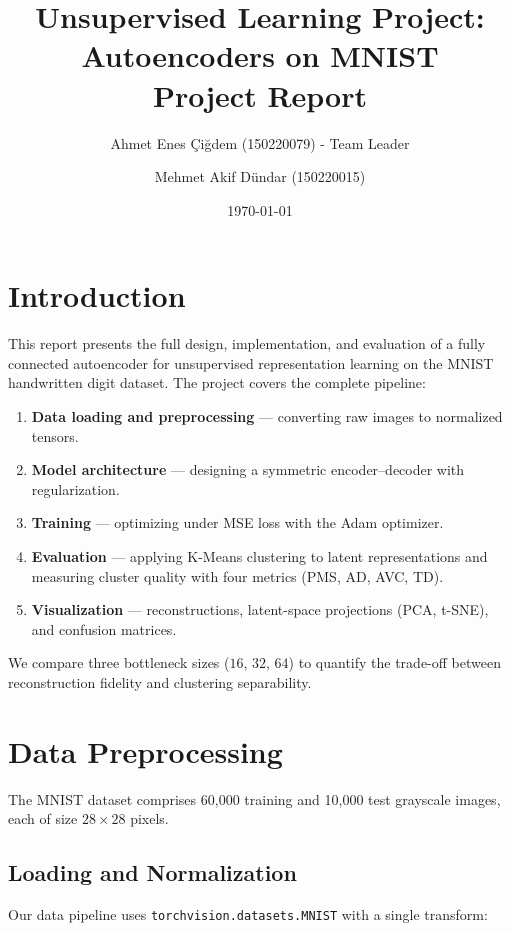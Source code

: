 \documentclass[12pt,a4paper]{article}
\title{Unsupervised Learning Project: Autoencoders on MNIST \texorpdfstring{\\[0.5em]}{ - }
\texorpdfstring{\large }{ }Project Report}
\author{Ahmet Enes \c{C}i\u{g}dem (150220079) - Team Leader \and Mehmet Akif D\"{u}ndar (150220015)}
\date{\today}
\begin{document}
\maketitle

\section{Introduction}

This report presents the full design, implementation, and evaluation of a fully connected autoencoder for unsupervised representation learning on the MNIST handwritten digit dataset. The project covers the complete pipeline:

\begin{enumerate}
    \item \textbf{Data loading and preprocessing} — converting raw images to normalized tensors.
    \item \textbf{Model architecture} — designing a symmetric encoder--decoder with regularization.
    \item \textbf{Training} — optimizing under MSE loss with the Adam optimizer.
    \item \textbf{Evaluation} — applying K-Means clustering to latent representations and measuring cluster quality with four metrics (PMS, AD, AVC, TD).
    \item \textbf{Visualization} — reconstructions, latent-space projections (PCA, t-SNE), and confusion matrices.
\end{enumerate}

We compare three bottleneck sizes ($16$, $32$, $64$) to quantify the trade-off between reconstruction fidelity and clustering separability.

\section{Data Preprocessing}

The MNIST dataset comprises 60{,}000 training and 10{,}000 test grayscale images, each of size $28 \times 28$ pixels.

\subsection{Loading and Normalization}
Our data pipeline uses \texttt{torchvision.datasets.MNIST} with a single transform:
\end{document}
